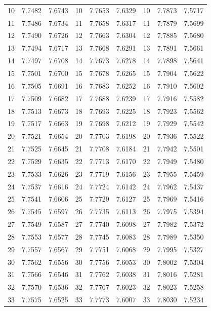 \documentclass[10pt,a4paper]{article}
\begin{document}
\begin{center}
\begin{longtable}{@{}r@{\hspace{0.8em}}r@{\hspace{0.8em}}r@{\hspace{1.5em}}r@{\hspace{0.8em}}r@{\hspace{0.8em}}r@{\hspace{1.5em}}r@{\hspace{0.8em}}r@{\hspace{0.8em}}r@{}}
10 & 7.7482 & 7.6743 & 10 & 7.7653 & 7.6329 & 10 & 7.7873 & 7.5717 \\
11 & 7.7486 & 7.6734 & 11 & 7.7658 & 7.6317 & 11 & 7.7879 & 7.5699 \\
12 & 7.7490 & 7.6726 & 12 & 7.7663 & 7.6304 & 12 & 7.7885 & 7.5680 \\
13 & 7.7494 & 7.6717 & 13 & 7.7668 & 7.6291 & 13 & 7.7891 & 7.5661 \\
14 & 7.7497 & 7.6708 & 14 & 7.7673 & 7.6278 & 14 & 7.7898 & 7.5641 \\
15 & 7.7501 & 7.6700 & 15 & 7.7678 & 7.6265 & 15 & 7.7904 & 7.5622 \\
16 & 7.7505 & 7.6691 & 16 & 7.7683 & 7.6252 & 16 & 7.7910 & 7.5602 \\
17 & 7.7509 & 7.6682 & 17 & 7.7688 & 7.6239 & 17 & 7.7916 & 7.5582 \\
18 & 7.7513 & 7.6673 & 18 & 7.7693 & 7.6225 & 18 & 7.7923 & 7.5562 \\
19 & 7.7517 & 7.6663 & 19 & 7.7698 & 7.6212 & 19 & 7.7929 & 7.5542 \\
20 & 7.7521 & 7.6654 & 20 & 7.7703 & 7.6198 & 20 & 7.7936 & 7.5522 \\
21 & 7.7525 & 7.6645 & 21 & 7.7708 & 7.6184 & 21 & 7.7942 & 7.5501 \\
22 & 7.7529 & 7.6635 & 22 & 7.7713 & 7.6170 & 22 & 7.7949 & 7.5480 \\
23 & 7.7533 & 7.6626 & 23 & 7.7719 & 7.6156 & 23 & 7.7955 & 7.5459 \\
24 & 7.7537 & 7.6616 & 24 & 7.7724 & 7.6142 & 24 & 7.7962 & 7.5437 \\
25 & 7.7541 & 7.6606 & 25 & 7.7729 & 7.6127 & 25 & 7.7969 & 7.5416 \\
26 & 7.7545 & 7.6597 & 26 & 7.7735 & 7.6113 & 26 & 7.7975 & 7.5394 \\
27 & 7.7549 & 7.6587 & 27 & 7.7740 & 7.6098 & 27 & 7.7982 & 7.5372 \\
28 & 7.7553 & 7.6577 & 28 & 7.7745 & 7.6083 & 28 & 7.7989 & 7.5350 \\
29 & 7.7557 & 7.6567 & 29 & 7.7751 & 7.6068 & 29 & 7.7995 & 7.5327 \\
30 & 7.7562 & 7.6556 & 30 & 7.7756 & 7.6053 & 30 & 7.8002 & 7.5304 \\
31 & 7.7566 & 7.6546 & 31 & 7.7762 & 7.6038 & 31 & 7.8016 & 7.5281 \\
32 & 7.7570 & 7.6536 & 32 & 7.7767 & 7.6023 & 32 & 7.8023 & 7.5258 \\
33 & 7.7575 & 7.6525 & 33 & 7.7773 & 7.6007 & 33 & 7.8030 & 7.5234 \\

\end{longtable}
\end{center}
\end{document}
